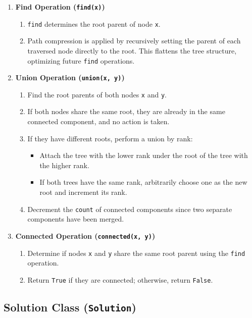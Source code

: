 \begin{enumerate}
    \item \textbf{Find Operation (\texttt{find(x)})}
    \begin{enumerate}
        \item \texttt{find} determines the root parent of node \texttt{x}.
        \item Path compression is applied by recursively setting the parent of each traversed node directly to the root. This flattens the tree structure, optimizing future \texttt{find} operations.
    \end{enumerate}
    
    \item \textbf{Union Operation (\texttt{union(x, y)})}
    \begin{enumerate}
        \item Find the root parents of both nodes \texttt{x} and \texttt{y}.
        \item If both nodes share the same root, they are already in the same connected component, and no action is taken.
        \item If they have different roots, perform a union by rank:
        \begin{itemize}
            \item Attach the tree with the lower rank under the root of the tree with the higher rank.
            \item If both trees have the same rank, arbitrarily choose one as the new root and increment its rank.
        \end{itemize}
        \item Decrement the \texttt{count} of connected components since two separate components have been merged.
    \end{enumerate}
    
    \item \textbf{Connected Operation (\texttt{connected(x, y)})}
    \begin{enumerate}
        \item Determine if nodes \texttt{x} and \texttt{y} share the same root parent using the \texttt{find} operation.
        \item Return \texttt{True} if they are connected; otherwise, return \texttt{False}.
    \end{enumerate}
\end{enumerate}

\subsection*{Solution Class (\texttt{Solution})}

